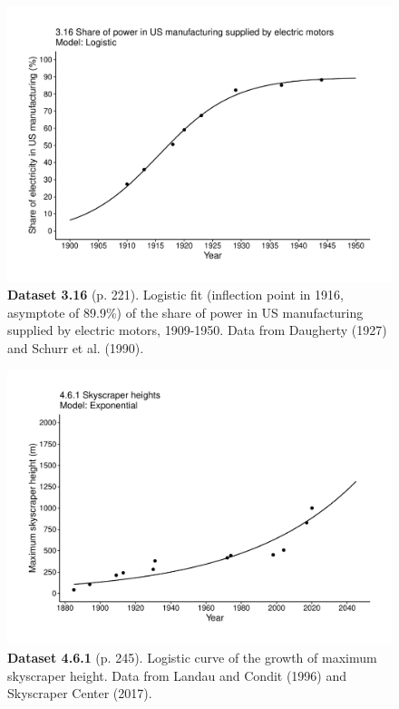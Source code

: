 \documentclass[aps,rmp,preprint,superscriptaddress,10pt,onecolumn]{article}
\begin{document}
\clearpage
\begin{figure}[h]
\includegraphics[width=\textwidth]{output/figs-ggplot/3.16.pdf}
\caption*{\textbf{Dataset 3.16} (p. 221). Logistic fit (inflection point in 1916, asymptote of 89.9\%) of the share of power in US manufacturing supplied by electric motors, 1909-1950. Data from Daugherty (1927) and Schurr et al. (1990).}
\end{figure}
	
\clearpage
\begin{figure}[h]
\includegraphics[width=\textwidth]{output/figs-ggplot/4.6.1.pdf}
\caption*{\textbf{Dataset 4.6.1} (p. 245). Logistic curve of the growth of maximum skyscraper height. Data from Landau and Condit (1996) and Skyscraper Center (2017).}
\end{figure}
	
\end{document}
